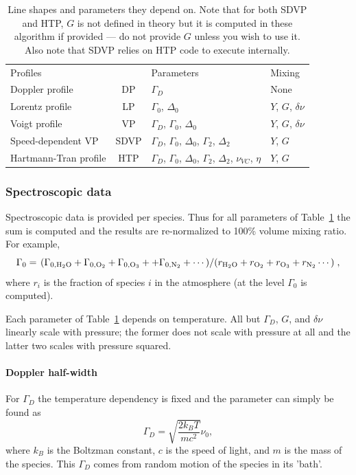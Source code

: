 \begin{table}[ht!]
 \centering
 \begin{tabular}{lcll}
  Profiles &  & Parameters & Mixing \\
  Doppler profile & DP & $\Gamma_D$ & None \\
  Lorentz profile & LP & $\Gamma_0$, $\Delta_0$ & $Y$, $G$, $\delta\nu$ \\
  Voigt profile & VP & $\Gamma_D$, $\Gamma_0$, $\Delta_0$ & $Y$, $G$, $\delta\nu$ \\
  Speed-dependent VP & SDVP & $\Gamma_D$, $\Gamma_0$, $\Delta_0$, $\Gamma_2$, $\Delta_2$ & $Y$, $G$ \\
  Hartmann-Tran profile & HTP & $\Gamma_D$, $\Gamma_0$, $\Delta_0$, $\Gamma_2$, $\Delta_2$, $\nu_{VC}$, $\eta$ & $Y$, $G$
 \end{tabular}
 \caption{Line shapes and parameters they depend on. Note that for both SDVP and HTP,
 $G$ is not defined in theory but it is computed in these algorithm if provided --- 
 do not provide $G$ unless you wish to use it. Also note that SDVP relies on HTP code to
 execute internally.}
 \label{tab:lsalg-ls-and-input}
\end{table}

\subsubsection{Spectroscopic data}
Spectroscopic data is provided per species.  Thus for all parameters of 
Table~\ref{tab:lsalg-ls-and-input} the sum is computed and the results 
are re-normalized to 100\% volume mixing ratio.  For example,
$$\Gamma_0 = \left.\left(\Gamma_{0,\rm{H}_2\rm{O}} + \Gamma_{0,\rm{O}_2} + \Gamma_{0,\rm{O}_3} +  + \Gamma_{0,\rm{N}_2} + \cdots\right)\middle/\left(r_{\rm{H}_2\rm{O}}+r_{\rm{O}_2}+r_{\rm{O}_3}+r_{\rm{N}_2}\cdots\right) \right. , $$
where $r_i$ is the fraction of 
species $i$ in the atmosphere (at the level $\Gamma_0$ is computed).

Each parameter of Table~\ref{tab:lsalg-ls-and-input}
depends on temperature.  All but $\Gamma_D$, $G$, and $\delta\nu$ linearly scale with pressure; the former does not scale with pressure at all and the latter two scales with pressure squared.

\paragraph*{Doppler half-width}

For $\Gamma_D$ the temperature dependency is fixed and the parameter can simply be found as
\begin{equation}
 \Gamma_D = \sqrt{\frac{2k_BT}{mc^2}} \nu_0,
\end{equation}
where $k_B$ is the Boltzman constant, $c$ is the speed of light, and $m$ is the mass of the species.
This $\Gamma_D$ comes from random motion of the species in its 'bath'.  

